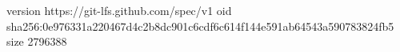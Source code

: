 version https://git-lfs.github.com/spec/v1
oid sha256:0e976331a220467d4c2b8dc901c6cdf6c614f144e591ab64543a590783824fb5
size 2796388
